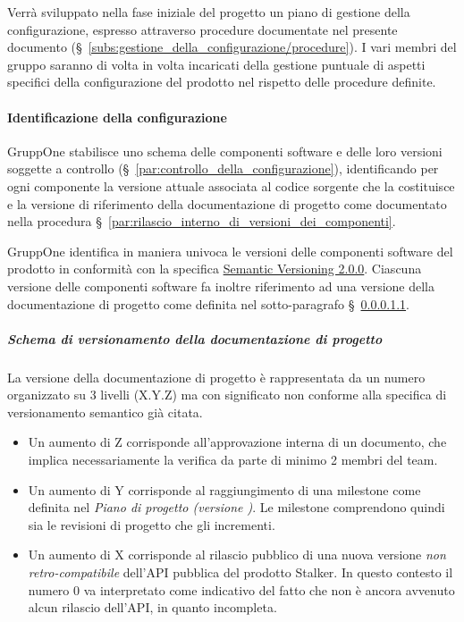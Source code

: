 \documentclass[../../norme-di-progetto.tex]{subfiles}
\begin{document}
Verrà sviluppato nella fase iniziale del progetto un piano di gestione della configurazione, espresso attraverso procedure documentate nel presente documento (§~\ref{subs:gestione_della_configurazione/procedure}).
I vari membri del gruppo saranno di volta in volta incaricati della gestione puntuale di aspetti specifici della configurazione del prodotto nel rispetto delle procedure definite.


\paragraph{Identificazione della configurazione}%
\label{par:identificazione_della_configurazione}

GruppOne stabilisce uno schema delle componenti software e delle loro versioni soggette a controllo (§~\ref{par:controllo_della_configurazione}), identificando per ogni componente la versione attuale associata al codice sorgente che la costituisce e la versione di riferimento della documentazione di progetto come documentato nella procedura §~\ref{par:rilascio_interno_di_versioni_dei_componenti}.

GruppOne identifica in maniera univoca le versioni delle componenti software del prodotto in conformità con la specifica \href{https://semver.org/spec/v2.0.0.html}{Semantic Versioning 2.0.0}.
Ciascuna versione delle componenti software fa inoltre riferimento ad una versione della documentazione di progetto come definita nel sotto-paragrafo §~\ref{subp:schema_di_versionamento_della_documentazione_di_progetto}.

\subparagraph{Schema di versionamento della documentazione di progetto}%
\label{subp:schema_di_versionamento_della_documentazione_di_progetto}

La versione della documentazione di progetto è rappresentata da un numero organizzato su 3 livelli (X.Y.Z) ma con significato non conforme alla specifica di versionamento semantico già citata.

\begin{itemize}
  \item Un aumento di Z corrisponde all'approvazione interna di un documento, che implica necessariamente la verifica da parte di minimo 2 membri del team.
  \item Un aumento di Y corrisponde al raggiungimento di una milestone come definita nel \textit{Piano di progetto (versione \versione)}. Le milestone comprendono quindi sia le revisioni di progetto che gli incrementi.
  \item Un aumento di X corrisponde al rilascio pubblico di una nuova versione \textit{non retro-compatibile} dell'API pubblica del prodotto Stalker. In questo contesto il numero 0 va interpretato come indicativo del fatto che non è ancora avvenuto alcun rilascio dell'API, in quanto incompleta.
\end{itemize}
\end{document}
